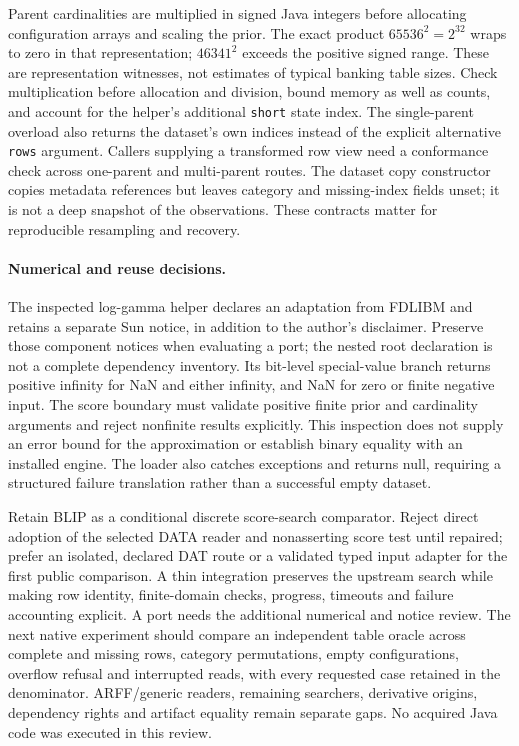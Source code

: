 Parent cardinalities are multiplied in signed Java integers before allocating
configuration arrays and scaling the prior. The exact product \(65536^2=2^{32}\)
wraps to zero in that representation; \(46341^2\) exceeds the positive signed
range. These are representation witnesses, not estimates of typical banking table
sizes. Check multiplication before allocation and division, bound memory as well
as counts, and account for the helper's additional \texttt{short} state index.
The single-parent overload also returns the dataset's own indices instead of the
explicit alternative \texttt{rows} argument. Callers supplying a transformed row
view need a conformance check across one-parent and multi-parent routes.
The dataset copy constructor copies metadata references but leaves category and
missing-index fields unset; it is not a deep snapshot of the observations.
These contracts matter for reproducible resampling and recovery.~\citep{exec28_blip_helpers,exec28_blip_helper_reference}

\paragraph{Numerical and reuse decisions.}
The inspected log-gamma helper declares an adaptation from FDLIBM and retains a
separate Sun notice, in addition to the author's disclaimer. Preserve those
component notices when evaluating a port; the nested root declaration is not a
complete dependency inventory. Its bit-level special-value branch returns positive
infinity for NaN and either infinity, and NaN for zero or finite negative input.
The score boundary must validate positive finite prior and cardinality arguments
and reject nonfinite results explicitly. This inspection does not supply an error
bound for the approximation or establish binary equality with an installed engine.
The loader also catches exceptions and returns null, requiring a structured failure
translation rather than a successful empty dataset.~\citep{exec28_blip_helpers}

Retain BLIP as a conditional discrete score-search comparator. Reject direct
adoption of the selected DATA reader and nonasserting score test until repaired;
prefer an isolated, declared DAT route or a validated typed input adapter for the
first public comparison. A thin integration preserves the upstream search while
making row identity, finite-domain checks, progress, timeouts and failure accounting
explicit. A port needs the additional numerical and notice review. The next native
experiment should compare an independent table oracle across complete and missing
rows, category permutations, empty configurations, overflow refusal and interrupted
reads, with every requested case retained in the denominator. ARFF/generic readers,
remaining searchers, derivative origins, dependency rights and artifact equality
remain separate gaps. No acquired Java code was executed in this review.
\citep{exec28_blip_helpers,exec28_blip_helper_reference}


